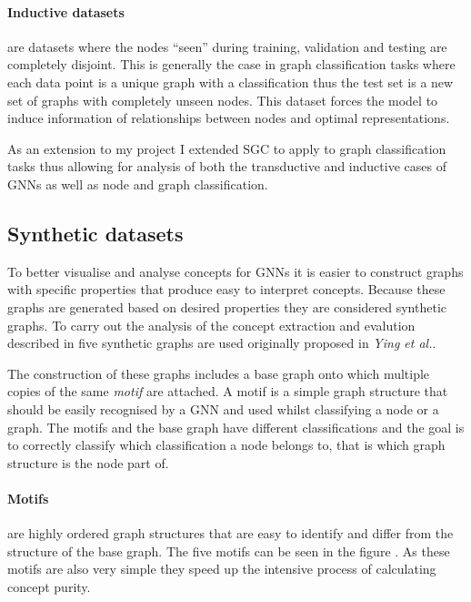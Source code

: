 \paragraph{Inductive datasets} are datasets where the nodes ``seen'' during training, validation and testing are completely disjoint.
This is generally the case in graph classification tasks where each data point is a unique graph with a classification thus the test set is a new set of graphs with completely unseen nodes.
This dataset forces the model to induce information of relationships between nodes and optimal representations.

As an extension to my project I extended SGC to apply to graph classification tasks thus allowing for analysis of both the transductive and inductive cases of GNNs as well as node and graph classification.

\subsection{Synthetic datasets}
\label{sec:synth}


To better visualise and analyse concepts for GNNs it is easier to construct graphs with specific properties that produce easy to interpret concepts.
Because these graphs are generated based on desired properties they are considered synthetic graphs.
To carry out the analysis of the concept extraction and evalution described in  five synthetic graphs are used originally proposed in \textit{Ying et al.}\cite{ying2019gnnexplainer}.

The construction of these graphs includes a base graph onto which multiple copies of the same \emph{motif} are attached.
A motif is a simple graph structure that should be easily recognised by a GNN and used whilst classifying a node or a graph.
The motifs and the base graph have different classifications and the goal is to correctly classify which classification a node belongs to, that is which graph structure is the node part of.

\paragraph{Motifs} are highly ordered graph structures that are easy to identify and differ from the structure of the base graph.
The five motifs can be seen in the figure .
As these motifs are also very simple they speed up the intensive process of calculating concept purity.

